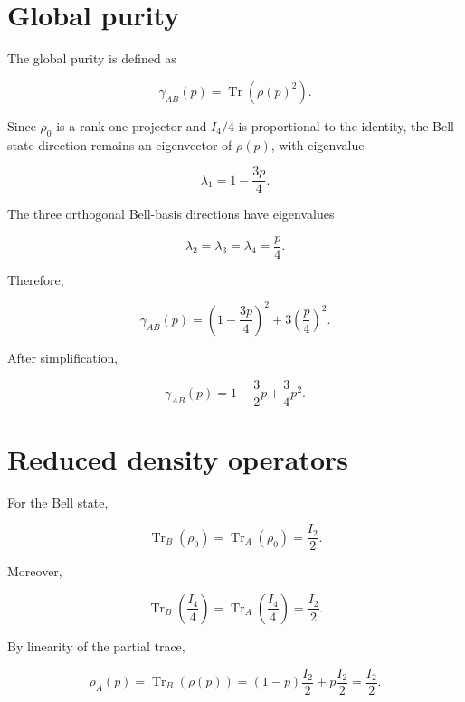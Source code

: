 
\section*{Global purity}

The global purity is defined as

\[
\gamma_{AB}(p)
=
\operatorname{Tr}
\left(
\rho(p)^2
\right).
\]

Since \( \rho_0 \) is a rank-one projector and \( I_4/4 \) is proportional to the identity, the Bell-state direction remains an eigenvector of \( \rho(p) \), with eigenvalue

\[
\lambda_1
=
1-\frac{3p}{4}.
\]

The three orthogonal Bell-basis directions have eigenvalues

\[
\lambda_2
=
\lambda_3
=
\lambda_4
=
\frac{p}{4}.
\]

Therefore,

\[
\gamma_{AB}(p)
=
\left(
1-\frac{3p}{4}
\right)^2
+
3
\left(
\frac{p}{4}
\right)^2.
\]

After simplification,

\begin{equation}
\gamma_{AB}(p)
=
1
-
\frac{3}{2}p
+
\frac{3}{4}p^2.
\label{eq:appendix_depolarizing_global_purity}
\end{equation}


\section*{Reduced density operators}

For the Bell state,

\[
\operatorname{Tr}_B(\rho_0)
=
\operatorname{Tr}_A(\rho_0)
=
\frac{I_2}{2}.
\]

Moreover,

\[
\operatorname{Tr}_B
\left(
\frac{I_4}{4}
\right)
=
\operatorname{Tr}_A
\left(
\frac{I_4}{4}
\right)
=
\frac{I_2}{2}.
\]

By linearity of the partial trace,

\[
\rho_A(p)
=
\operatorname{Tr}_B(\rho(p))
=
(1-p)\frac{I_2}{2}
+
p\frac{I_2}{2}
=
\frac{I_2}{2}.
\]

